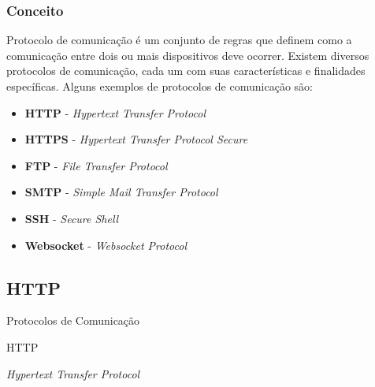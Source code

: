 \documentclass[
	10pt, %
	t, %
]{beamer}
\begin{document}
\begin{frame}
	\frametitle{Conceito}

	Protocolo de comunicação é um conjunto de regras que definem como a comunicação entre dois ou mais dispositivos deve ocorrer. Existem diversos protocolos de comunicação, cada um com suas características e finalidades específicas. Alguns exemplos de protocolos de comunicação são:

	\begin{itemize}
		\item \textbf{HTTP} - \textit{Hypertext Transfer Protocol}
		\item \textbf{HTTPS} - \textit{Hypertext Transfer Protocol Secure}
		\item \textbf{FTP} - \textit{File Transfer Protocol}
		\item \textbf{SMTP} - \textit{Simple Mail Transfer Protocol}
		\item \textbf{SSH} - \textit{Secure Shell}
		\item \textbf{Websocket} - \textit{Websocket Protocol}
	\end{itemize}

	

\end{frame}


\subsection{HTTP}

\begin{frame}
	\begin{center}
		
		\bigskip\bigskip\bigskip\bigskip %
		{\Large Protocolos de Comunicação}
		
		\bigskip\bigskip %
		{\Huge HTTP}
		
		\smallskip
		{\small \textit{Hypertext Transfer Protocol}}
	\end{center}

\end{frame}
\end{document}
